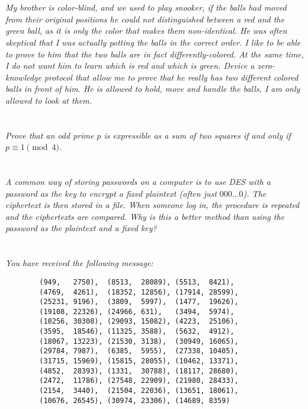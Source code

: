 \documentclass[12pt]{article}
\begin{document}
\section{} \textit{My brother is color-blind, and we used to play snooker, if the balls had moved from their original positions he could not distinguished between a red and the green ball, as it is only the color that makes them non-identical. He was often skeptical that I was actually potting the balls in the correct order. I like to be able to prove to him that the two balls are in fact differently-colored. At the same time, I do not want him to learn which is red and which is green. Device a zero-knowledge protocol that allow me to prove that he really has two different colored balls in front of him. He is allowed to hold, move and handle the balls, I am only allowed to look at them. }

\section{} \textit{Prove that an odd prime $p$ is expressible as a sum of two squares if and only if $p \equiv 1 \pmod{4}$.}

\section{} \textit{A common way of storing passwords on a computer is to use DES with a password as the key to encrypt a fixed plaintext (often just $000\dots0$). The ciphertext is then stored in a file. When someone log in, the procedure is repeated and the ciphertexts are compared. Why is this a better method than using the password as the plaintext and a fixed key?}

\section{} \textit{You have received the following message:}

    \begin{verbatim}
        (949,   2750),  (8513,  28089), (5513,  8421),
        (4769,  4261),  (18352, 12856), (17914, 28599),
        (25231, 9196),  (3809,  5997),  (1477,  19626),
        (19108, 22326), (24966, 631),   (3494,  5974),
        (10256, 30308), (29093, 15082), (4223,  25106),
        (3595,  18546), (11325, 3588),  (5632,  4912),
        (18067, 13223), (21530, 3138),  (30949, 16065),
        (29784, 7987),  (6385,  5955),  (27338, 10405),
        (31715, 15969), (15815, 28055), (10462, 13371),
        (4852,  28393), (1331,  30788), (18117, 28680),
        (2472,  11786), (27548, 22909), (21980, 28433),
        (2154,  3440),  (21504, 22036), (13651, 18061),
        (10676, 26545), (30974, 23306), (14689, 8359)
    \end{verbatim}
\end{document}
